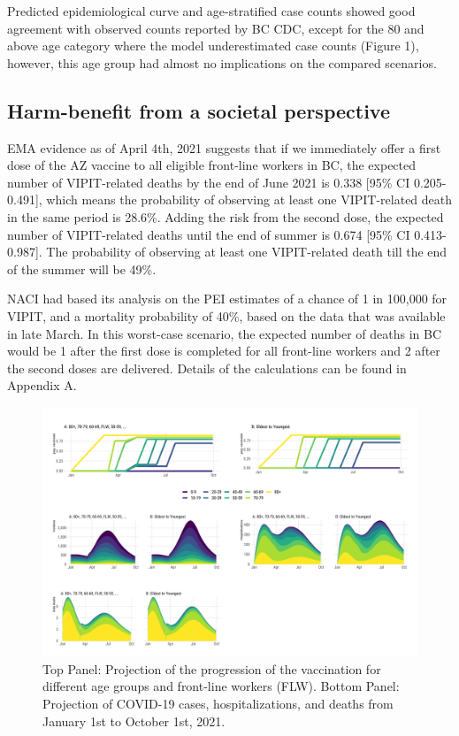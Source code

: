 \documentclass[]{elsarticle} %
\begin{document}
Predicted epidemiological curve and age-stratified case counts showed
good agreement with observed counts reported by BC CDC, except for the
80 and above age category where the model underestimated case counts
(Figure 1), however, this age group had almost no implications on the
compared scenarios.

\hypertarget{harm-benefit-from-a-societal-perspective}{%
\subsection{Harm-benefit from a societal
perspective}\label{harm-benefit-from-a-societal-perspective}}

EMA evidence as of April 4th, 2021 suggests that if we immediately offer
a first dose of the AZ vaccine to all eligible front-line workers in BC,
the expected number of VIPIT-related deaths by the end of June 2021 is
0.338 {[}95\% CI 0.205-0.491{]}, which means the probability of
observing at least one VIPIT-related death in the same period is 28.6\%.
Adding the risk from the second dose, the expected number of
VIPIT-related deaths until the end of summer is 0.674 {[}95\% CI
0.413-0.987{]}. The probability of observing at least one VIPIT-related
death till the end of the summer will be 49\%.

NACI had based its analysis on the PEI estimates of a chance of 1 in
100,000 for VIPIT, and a mortality probability of 40\%, based on the
data that was available in late March. In this worst-case scenario, the
expected number of deaths in BC would be 1 after the first dose is
completed for all front-line workers and 2 after the second doses are
delivered. Details of the calculations can be found in Appendix A.

\begin{figure}

{\centering \includegraphics[width=1\linewidth]{../figures/fig-trajectoriesFull} 

}

\caption{Top Panel: Projection of the progression of the vaccination for different age groups and front-line workers (FLW). Bottom Panel: Projection of COVID-19 cases, hospitalizations, and deaths from January 1st to October 1st, 2021.}\label{fig:fig1}
\end{figure}
\end{document}
